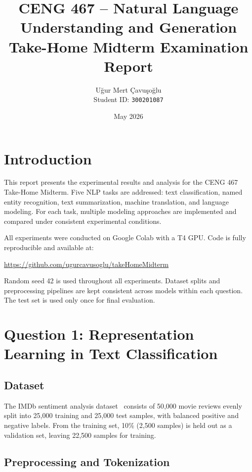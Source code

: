 \documentclass[12pt,a4paper]{article}
\title{
    \textbf{CENG 467 -- Natural Language Understanding and Generation} \\
    \large Take-Home Midterm Examination Report
}
\author{Uğur Mert Çavuşoğlu \\ Student ID: \texttt{300201087}}
\date{May 2026}
\begin{document}
\maketitle
\tableofcontents
\newpage

\section{Introduction}

This report presents the experimental results and analysis for the CENG 467 Take-Home Midterm. Five NLP tasks are addressed: text classification, named entity recognition, text summarization, machine translation, and language modeling. For each task, multiple modeling approaches are implemented and compared under consistent experimental conditions.

All experiments were conducted on Google Colab with a T4 GPU. Code is fully reproducible and available at:
\begin{center}
\url{https://github.com/ugurcavusoglu/takeHomeMidterm}
\end{center}

Random seed 42 is used throughout all experiments. Dataset splits and preprocessing pipelines are kept consistent across models within each question. The test set is used only once for final evaluation.

\section{Question 1: Representation Learning in Text Classification}

\subsection{Dataset}

The IMDb sentiment analysis dataset~\citep{maas2011imdb} consists of 50{,}000 movie reviews evenly split into 25{,}000 training and 25{,}000 test samples, with balanced positive and negative labels. From the training set, 10\% (2{,}500 samples) is held out as a validation set, leaving 22{,}500 samples for training.

\subsection{Preprocessing and Tokenization}
\end{document}
